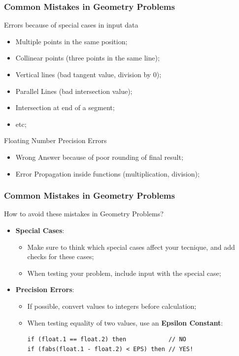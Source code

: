 \begin{frame}
  \frametitle{Common Mistakes in Geometry Problems}

    \begin{block}{Errors because of special cases in input data}
      \begin{itemize}
        \item Multiple points in the same position;
        \item Collinear points (three points in the same line);
        \item Vertical lines (bad tangent value, division by 0);
        \item Parallel Lines (bad intersection value);
        \item Intersection at end of a segment;
        \item etc;
      \end{itemize}
    \end{block}

    \begin{block}{Floating Number Precision Errors}
      \begin{itemize}
        \item Wrong Answer because of poor rounding of final result;
        \item Error Propagation inside functions (multiplication, division);
      \end{itemize}
    \end{block}
\end{frame}


\begin{frame}[fragile]
  \frametitle{Common Mistakes in Geometry Problems}

  How to avoid these mistakes in Geometry Problems?\bigskip

  \begin{itemize}
    \item {\bf Special Cases}:
    \begin{itemize}
      \item Make sure to think which special cases affect your tecnique, and add checks for these cases;
      \item When testing your problem, include input with the special case;
    \end{itemize}\bigskip

    \item {\bf Precision Errors}:
    \begin{itemize}
      \item If possible, convert values to integers before calculation;
      \item When testing equality of two values, use an {\bf Epsilon Constant}:
\begin{verbatim}
if (float.1 == float.2) then            // NO
if (fabs(float.1 - float.2) < EPS) then // YES!
\end{verbatim}
    \end{itemize}
  \end{itemize}
\end{frame}

